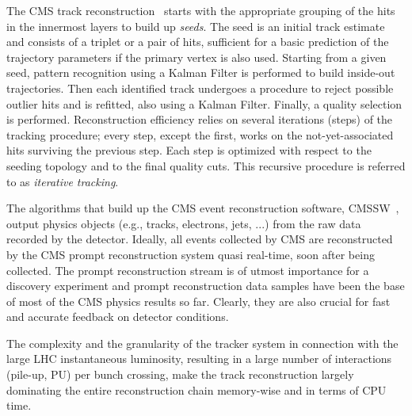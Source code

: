 

The CMS track reconstruction~\cite{trackreco} starts with the appropriate grouping of the hits
in the innermost layers to build up {\em seeds}. The seed is an initial track
estimate and consists of a triplet or a pair of hits, sufficient for a
basic prediction of the trajectory parameters if the primary vertex is
 also used. Starting from a given seed, pattern recognition using a Kalman Filter
is performed to build inside-out trajectories. Then each identified
track undergoes a procedure to reject possible outlier hits and is
refitted, also using a Kalman Filter. Finally, a quality selection is
performed. Reconstruction efficiency relies on several iterations (steps) of the
tracking procedure; every step, except the first, works on the
not-yet-associated hits surviving the previous step. Each step is
optimized with respect to the seeding topology and to the final
quality cuts. This recursive procedure is referred to as {\em
  iterative tracking}.

The algorithms that build up the CMS event reconstruction software, CMSSW~\cite{cmssw},
output physics objects (e.g., tracks, electrons, jets, ...) from the
raw data recorded by the detector. Ideally, all events collected by CMS are
reconstructed by the CMS prompt reconstruction system quasi real-time, soon after being
collected. The prompt reconstruction stream is of utmost
importance for a discovery experiment and prompt reconstruction data
samples have been the base of most of the CMS physics results so
far. Clearly, they are also crucial for fast and accurate feedback on detector
conditions.

The complexity and the granularity of the tracker system in
connection with the large LHC instantaneous luminosity, resulting in a
large number of interactions (pile-up, PU) per bunch crossing, make the
track reconstruction largely dominating the entire reconstruction
chain memory-wise and in terms of CPU time.


